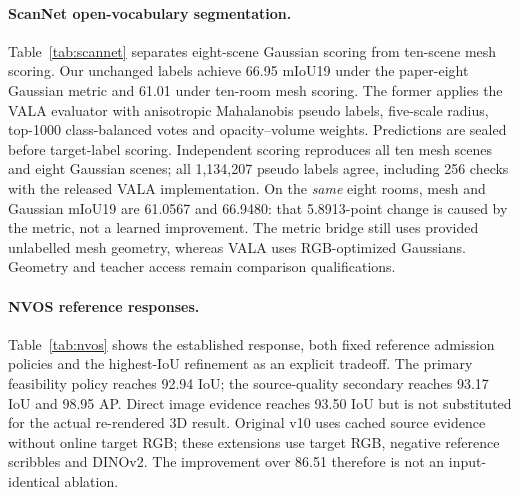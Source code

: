 \paragraph{ScanNet open-vocabulary segmentation.}
Table~\ref{tab:scannet} separates eight-scene Gaussian scoring from ten-scene
mesh scoring. Our unchanged labels achieve 66.95 mIoU19 under the paper-eight
Gaussian metric and 61.01 under ten-room mesh scoring. The former applies the
VALA evaluator with anisotropic Mahalanobis pseudo labels, five-scale radius,
top-1000 class-balanced votes and opacity--volume weights. Predictions are
sealed before target-label scoring. Independent scoring reproduces all ten
mesh scenes and eight Gaussian scenes; all 1,134,207 pseudo labels agree,
including 256 checks with the released VALA implementation. On the \emph{same}
eight rooms, mesh and Gaussian mIoU19 are 61.0567 and 66.9480: that 5.8913-point
change is caused by the metric, not a learned improvement. The metric bridge
still uses provided unlabelled mesh geometry, whereas VALA uses RGB-optimized
Gaussians. Geometry and teacher access remain comparison qualifications.
\begin{table}[ht]
\centering\small\resizebox{\linewidth}{!}{}
\caption{ScanNet OVS. Published context from VALA Table 2~\cite{vala}.
Paper8 Gaussian and internal10 mesh scoring are separate tracks.
The metric bridge aligns scoring, not teacher or geometry access.}
\label{tab:scannet}
\end{table}

\paragraph{NVOS reference responses.}
Table~\ref{tab:nvos} shows the established response, both fixed reference
admission policies and the highest-IoU refinement as an explicit tradeoff.
The primary feasibility policy reaches 92.94 IoU; the source-quality secondary
reaches 93.17 IoU and 98.95 AP. Direct image evidence reaches 93.50 IoU but is
not substituted for the actual re-rendered 3D result. Original v10 uses cached
source evidence without online target RGB; these extensions use target RGB,
negative reference scribbles and DINOv2. The improvement over 86.51 therefore
is not an input-identical ablation.

